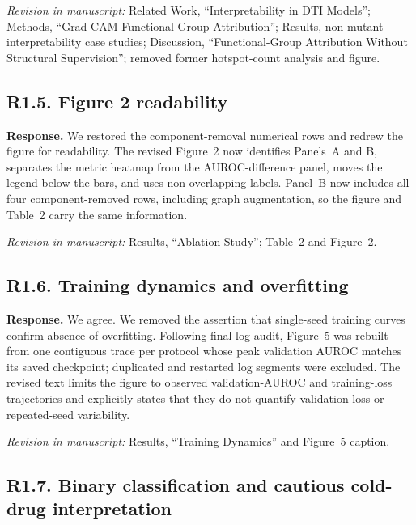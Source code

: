 \documentclass[11pt,a4paper]{article}
\newcommand{\response}{\noindent\textbf{Response.} }
\newcommand{\change}[1]{\par\smallskip\noindent\textit{Revision in manuscript:} #1\par\medskip}
\begin{document}
\change{Related Work, ``Interpretability in DTI Models''; Methods,
``Grad-CAM Functional-Group Attribution''; Results, non-mutant
interpretability case studies; Discussion, ``Functional-Group Attribution
Without Structural Supervision''; removed former hotspot-count analysis and
figure.}

\subsection*{R1.5. Figure 2 readability}


\response We restored the component-removal numerical rows and redrew the figure
for readability. The revised Figure~2 now identifies Panels~A and B, separates
the metric heatmap from the AUROC-difference panel, moves the legend below the
bars, and uses non-overlapping labels. Panel~B now includes all four
component-removed rows, including graph augmentation, so the figure and Table~2
carry the same information.

\change{Results, ``Ablation Study''; Table~2 and Figure~2.}

\subsection*{R1.6. Training dynamics and overfitting}


\response We agree. We removed the assertion that single-seed training curves
confirm absence of overfitting. Following final log audit, Figure~5 was rebuilt
from one contiguous trace per protocol whose peak validation AUROC matches its
saved checkpoint; duplicated and restarted log segments were excluded. The
revised text limits the figure to observed validation-AUROC and training-loss
trajectories and explicitly states that they do not quantify validation loss or
repeated-seed variability.

\change{Results, ``Training Dynamics'' and Figure~5 caption.}

\subsection*{R1.7. Binary classification and cautious cold-drug interpretation}
\end{document}
